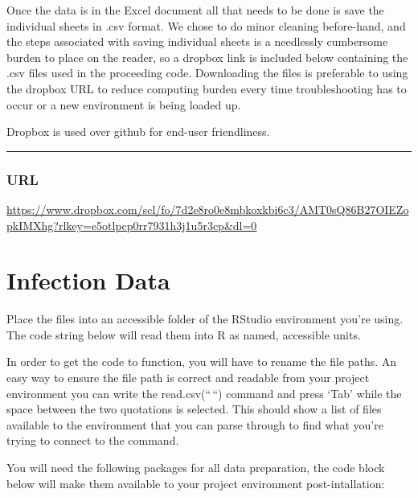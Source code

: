 \documentclass[
  11,
]{book}
\begin{document}
Once the data is in the Excel document all that needs to be done is save the individual sheets in .csv format. We chose to do minor cleaning before-hand, and the steps associated with saving individual sheets is a needlessly cumbersome burden to place on the reader, so a dropbox link is included below containing the .csv files used in the proceeding code. Downloading the files is preferable to using the dropbox URL to reduce computing burden every time troubleshooting has to occur or a new environment is being loaded up.

Dropbox is used over github for end-user friendliness.

\begin{center}\rule{0.5\linewidth}{0.5pt}\end{center}

\hypertarget{url}{%
\subsubsection*{URL}\label{url}}


\url{https://www.dropbox.com/scl/fo/7d2e8ro0e8mbkoxkbi6c3/AMT0sQ86B27OIEZopkIMXhg?rlkey=e5otlpcp0rr7931h3j1u5r3cp\&dl=0}

\hypertarget{infection-data}{%
\section*{Infection Data}\label{infection-data}}


Place the files into an accessible folder of the RStudio environment you're using. The code string below will read them into R as named, accessible units.

In order to get the code to function, you will have to rename the file paths. An easy way to ensure the file path is correct and readable from your project environment you can write the read.csv(``\,``) command and press `Tab' while the space between the two quotations is selected. This should show a list of files available to the environment that you can parse through to find what you're trying to connect to the command.

You will need the following packages for all data preparation, the code block below will make them available to your project environment post-intallation:
\end{document}
